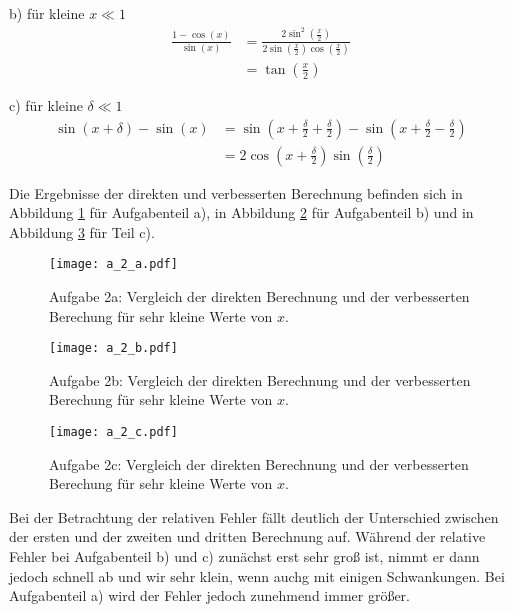 b) für kleine $x \ll 1$
\begin{align*}
  \frac{1-\cos \left(x \right)}{\sin \left(x \right)} &= \frac{2 \sin^2 \left(\frac{x}{2}\right)}{2 \sin \left(\frac{x}{2}\right) \cos \left(\frac{x}{2}\right)} \\
                                                      &= \tan \left(\frac{x}{2}\right)
\end{align*}

c) für kleine $\delta \ll 1$
\begin{align*}
  \sin \left(x + \delta \right) - \sin \left(x \right) &= \sin \left(x + \frac{\delta}{2} + \frac{\delta}{2}\right) - \sin \left(x + \frac{\delta}{2} - \frac{\delta}{2} \right) \\
                                                       &= 2 \cos \left(x + \frac{\delta}{2}\right) \sin \left(\frac{\delta}{2}\right)
\end{align*}

Die Ergebnisse der direkten und verbesserten Berechnung befinden sich in Abbildung \ref{fig:plot2a} für Aufgabenteil a), in  Abbildung \ref{fig:plot2b}
für Aufgabenteil b) und in  Abbildung \ref{fig:plot2c} für Teil c).

\begin{figure}[h]
    \centering
    \texttt{[image: a\_2\_a.pdf]}
    \caption{Aufgabe 2a: Vergleich der direkten Berechnung und der verbesserten Berechung für sehr kleine Werte von $x$.}
    \label{fig:plot2a}
\end{figure}

\FloatBarrier
\begin{figure}[h]
    \centering
    \texttt{[image: a\_2\_b.pdf]}
    \caption{Aufgabe 2b: Vergleich der direkten Berechnung und der verbesserten Berechung für sehr kleine Werte von $x$.}
    \label{fig:plot2b}
\end{figure}
\FloatBarrier

\begin{figure}[h]
    \centering
    \texttt{[image: a\_2\_c.pdf]}
    \caption{Aufgabe 2c: Vergleich der direkten Berechnung und der verbesserten Berechung für sehr kleine Werte von $x$.}
    \label{fig:plot2c}
\end{figure}
\FloatBarrier

Bei der Betrachtung der relativen Fehler fällt deutlich der Unterschied zwischen der ersten und der zweiten
und dritten Berechnung auf. Während der relative Fehler bei Aufgabenteil b) und c) zunächst erst sehr groß ist,
nimmt er dann jedoch schnell ab und wir sehr klein, wenn auchg mit einigen Schwankungen. Bei Aufgabenteil a)
wird der Fehler jedoch zunehmend immer größer.

